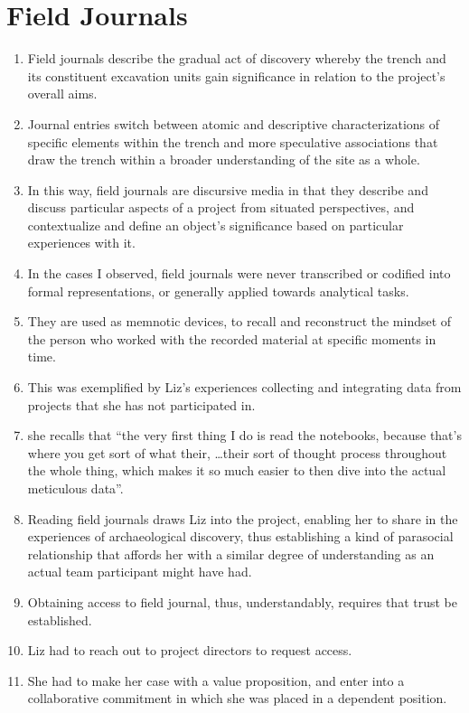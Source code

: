 \documentclass[12pt]{article}
\begin{document}
\section{Field Journals}
\begin{enumerate}
  \item Field journals describe the gradual act of discovery whereby the trench and its constituent excavation units gain significance in relation to the project's overall aims.
  \item Journal entries switch between atomic and descriptive characterizations of specific elements within the trench and more speculative associations that draw the trench within a broader understanding of the site as a whole.
  \item In this way, field journals are discursive media in that they describe and discuss particular aspects of a project from situated perspectives, and contextualize and define an object's significance based on particular experiences with it.
  \item In the cases I observed, field journals were never transcribed or codified into formal representations, or generally applied towards analytical tasks.
  \item They are used as memnotic devices, to recall and reconstruct the mindset of the person who worked with the recorded material at specific moments in time.
  \item This was exemplified by Liz's experiences collecting and integrating data from projects that she has not participated in.
  \item she recalls that ``the very first thing I do is read the notebooks, because that’s where you get sort of what their, \dots their sort of thought process throughout the whole thing, which makes it so much easier to then dive into the actual meticulous data''.
  \item Reading field journals draws Liz into the project, enabling her to share in the experiences of archaeological discovery, thus establishing a kind of parasocial relationship that affords her with a similar degree of understanding as an actual team participant might have had.
  \item Obtaining access to field journal, thus, understandably, requires that trust be established.
  \item Liz had to reach out to project directors to request access.
  \item She had to make her case with a value proposition, and enter into a collaborative commitment in which she was placed in a dependent position.
  

\end{enumerate}
\end{document}
